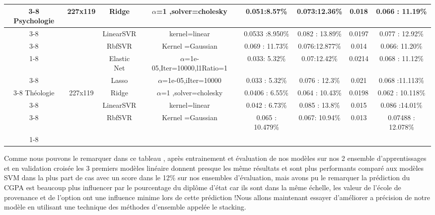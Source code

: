 \begin{table} [!htbp]
{{\begin{tabular}{|c|c|c|c|c|c|c|c|}
		\cline{3-8}
		Psychologie&227x119&Ridge&${\alpha}$=1 ,solver=cholesky&0.051:8.57\% &0.073:12.36\%&0.018& 0.066 : 11.19\%\\
		\cline{3-8}
		&&LinearSVR&kernel=linear&0.0533 :8.950\%&0.082 :  13.89\%&0.0197& 0.077 : 12.92\%\\
		\cline{3-8}
		&&RbfSVR&Kernel =Gaussian&0.069 : 11.73\%&0.076:12.877\%& 0.014&0.066: 11.20\% \\
		\cline{1-8}
		\hline
		\multirow{5}{*}{}
		&&Elastic Net&${\alpha}$=1e-05,Iter=10000,l1Ratio=1&0.033: 5.32\%&0.07:12.42\%&0.0214&0.068 : 11.12\% \\
		\cline{3-8}
		&&Lasso&${\alpha}$=1e-05,iIter=10000&0.033 :  5.32\%&0.076 :  12.3\%&0.021& 0.068 :11.113\%\\
		\cline{3-8}
		Théologie&227x119&Ridge&${\alpha}$=1 ,solver=cholesky&0.0406 : 6.55\% &0.064 : 10.43\%& 0.0198& 0.062 : 10.118\%\\
		\cline{3-8}
		&&LinearSVR&kernel=linear&0.042 : 6.73\%&0.085 : 13.8\%& 0.015&0.086 :14.01\% \\
		\cline{3-8}
		&&RbfSVR&Kernel =Gaussian&0.065 : 10.479\%&0.067: 10.94\%&0.013&0.07488 : 12.078\% \\
		\cline{1-8}
		\hline
	\end{tabular}}}
	\endgroup
\end{table}
\newpage
Comme nous pouvons le remarquer dans ce tableau , après entrainement et évaluation de nos modèles sur nos 2 ensemble d'apprentissages et en validation croisée les 3 premiers modèles linéaire donnent presque les même résultats et sont plus performants comparé aux modèles \ac{SVM} dans la plus part de cas avec un score dans le 12\% sur nos ensembles d'évaluation, mais avons pu le remarquer la prédiction du \ac{CGPA} est beaucoup plus influencer par le pourcentage du diplôme d'état car ils sont dans la même échelle, les valeur de l'école de provenance et de l'option ont une influence minime lors de cette prédiction !Nous allons maintenant essayer d'améliorer a précision de notre modèle en utilisant  une technique des méthodes d'ensemble appelée le stacking.
